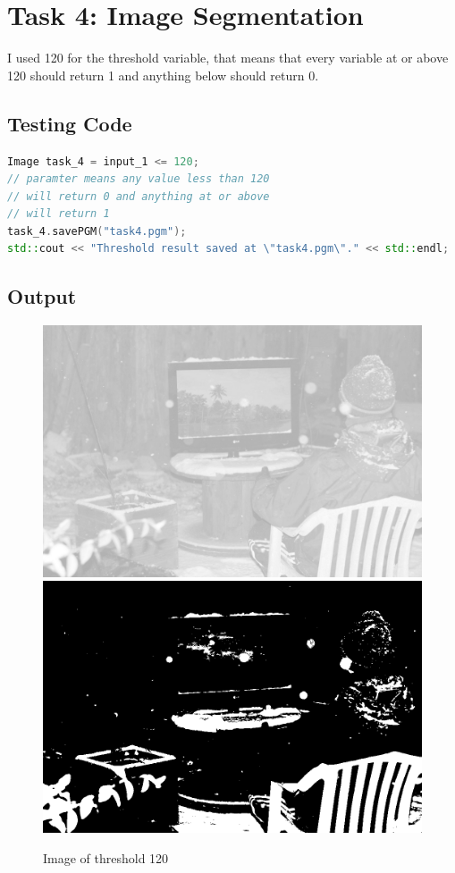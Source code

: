 \documentclass[pdftex,a4paper,10pt,titlepage]{article}
\begin{document}
\pagebreak
\section{Task 4: Image Segmentation}
I used 120 for the threshold variable, that means that every variable at or above 120 should return 1 and anything below should return 0.
\subsection{Testing Code}
\begin{lstlisting}[language=C++]
Image task_4 = input_1 <= 120;
// paramter means any value less than 120
// will return 0 and anything at or above
// will return 1
task_4.savePGM("task4.pgm");
std::cout << "Threshold result saved at \"task4.pgm\"." << std::endl;
\end{lstlisting}
\subsection{Output}
\begin{figure}[h]
\includegraphics[scale=0.225]{snow.png}
\includegraphics[scale=0.225]{task4.png} 
\caption {Image of threshold 120}
\label{fig:copied_image}
\end{figure}
\end{document}
